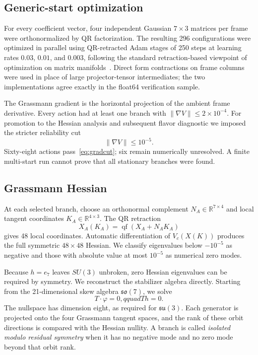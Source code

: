 \documentclass[11pt]{article}
\newcommand{\RR}{\mathbb R}
\begin{document}
\subsection{Generic-start optimization}

For every coefficient vector, four independent Gaussian $7\times3$ matrices per frame were orthonormalized by QR factorization.  The resulting 296 configurations were optimized in parallel using QR-retracted Adam stages of 250 steps at learning rates $0.03$, $0.01$, and $0.003$, following the standard retraction-based viewpoint of optimization on matrix manifolds~\cite{AbsilMahonySepulchre2008}.  Direct form contractions on frame columns were used in place of large projector-tensor intermediates; the two implementations agree exactly in the float64 verification sample.

The Grassmann gradient is the horizontal projection of the ambient frame derivative.  Every action had at least one branch with $\lVert\nabla V\rVert\le2\times10^{-4}$.  For promotion to the Hessian analysis and subsequent flavor diagnostic we imposed the stricter reliability cut
\begin{equation}
  \lVert\nabla V\rVert\le10^{-5}.
  \label{eq:gradcut}
\end{equation}
Sixty-eight actions pass~\eqref{eq:gradcut}; six remain numerically unresolved.  A finite multi-start run cannot prove that all stationary branches were found.

\subsection{Grassmann Hessian}

At each selected branch, choose an orthonormal complement $N_A\in\RR^{7\times4}$ and local tangent coordinates $K_A\in\RR^{4\times3}$.  The QR retraction
\begin{equation}
  X_A(K_A)=\operatorname{qf}(X_A+N_AK_A)
\end{equation}
gives 48 local coordinates.  Automatic differentiation of $V_c(X(K))$ produces the full symmetric $48\times48$ Hessian.  We classify eigenvalues below $-10^{-5}$ as negative and those with absolute value at most $10^{-5}$ as numerical zero modes.

Because $h=e_7$ leaves $SU(3)$ unbroken, zero Hessian eigenvalues can be required by symmetry.  We reconstruct the stabilizer algebra directly.  Starting from the 21-dimensional skew algebra $\mathfrak{so}(7)$, we solve
\begin{equation}
  T\cdot\varphi=0,qquad Th=0.
\end{equation}
The nullspace has dimension eight, as required for $\mathfrak{su}(3)$.  Each generator is projected onto the four Grassmann tangent spaces, and the rank of these orbit directions is compared with the Hessian nullity.  A branch is called \emph{isolated modulo residual symmetry} when it has no negative mode and no zero mode beyond that orbit rank.
\end{document}
